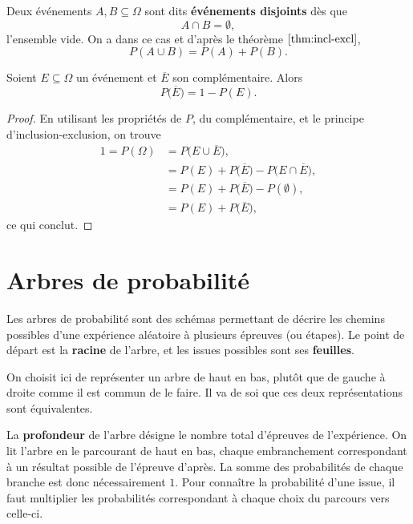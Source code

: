 \documentclass[a4paper, 12pt]{report}
\begin{document}
\begin{defn}
	Deux événements $A, B \subseteq \Omega$ sont dits \textbf{événements disjoints} dès que
		\[ A \cap B = \emptyset, \]
	l'ensemble vide.
	On a dans ce cas et d'après le théorème $\ref{thm:incl-excl}$,
		\[ P(A \cup B) = P(A) + P(B). \]
\end{defn}

\begin{coro}
	Soient $E \subseteq \Omega$ un événement et $\overline{E}$ son complémentaire.
	Alors
		\[ P\bigl( \overline{E} \bigr) = 1 - P(E). \]
\end{coro}

\begin{proof}
	En utilisant les propriétés de $P$, du complémentaire, et le principe d'inclusion-exclusion, on trouve
		\begin{align*}
		 1 = P(\Omega) &= P\bigl( E \cup \overline{E} \bigr), \\
		 				&= P(E) + P\bigl(\overline{E}\bigr) - P\bigl( E \cap \overline{E}\bigr), \\
		 				&= P(E) + P\bigl(\overline{E}\bigr) - P( \emptyset), \\
		 				&= P(E) + P\bigl(\overline{E}\bigr),
		\end{align*}
	ce qui conclut.
\end{proof}


\section{Arbres de probabilité}

Les arbres de probabilité sont des schémas permettant de décrire les chemins possibles d'une expérience aléatoire à plusieurs épreuves (ou étapes).
Le point de départ est la \textbf{racine} de l'arbre, et les issues possibles sont ses \textbf{feuilles}.

On choisit ici de représenter un arbre de haut en bas, plutôt que de gauche à droite comme il est commun de le faire.
Il va de soi que ces deux représentations sont équivalentes.

La \textbf{profondeur} de l'arbre désigne le nombre total d'épreuves de l'expérience.
On lit l'arbre en le parcourant de haut en bas, chaque embranchement correspondant à un résultat possible de l'épreuve d'après.
La somme des probabilités de chaque branche est donc nécessairement $1$.
Pour connaître la probabilité d'une issue, il faut multiplier les probabilités correspondant à chaque choix du parcours vers celle-ci.
\end{document}
